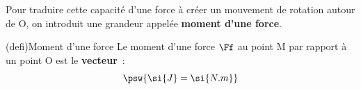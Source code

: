 \documentclass[../../main/main.tex]{subfiles}
\begin{document}
\begin{isd}
	\begin{center}
	\end{center}
	\tcblower
	\begin{center}
	\end{center}
\end{isd}

Pour traduire cette capacité d'une force à créer un mouvement de rotation autour
de O, on introduit une grandeur appelée \textbf{moment d'une force}.

\begin{tcb*}[sidebyside, righthand ratio=.2](defi){Moment d'une force}
	Le moment d'une force $\Ff$ au point M par rapport à un point O est le
	\textbf{vecteur}~:
	\psw{
		\[\boxed{\Mcf_{\Or}(\Ff) = \OM\wedge\Ff}\]
	}
	\tcblower
	\[
		\psw{
			\si{J} = \si{N.m}
		}
	\]
\end{tcb*}
\end{document}
